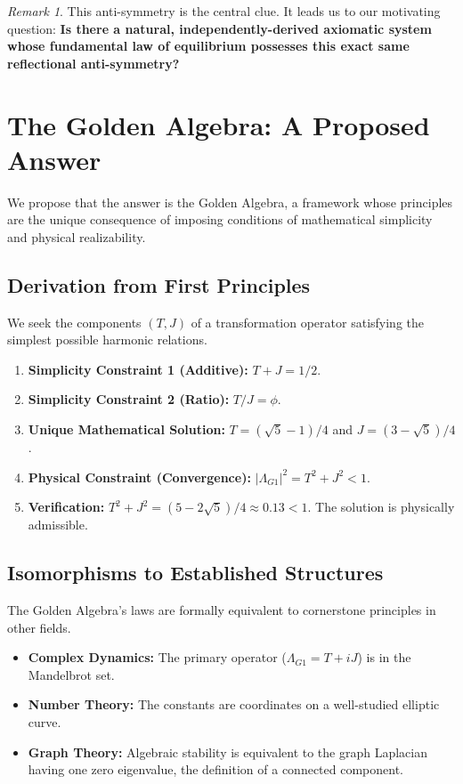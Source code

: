 \documentclass{article}
\theoremstyle{plain}
\theoremstyle{definition}
\theoremstyle{remark}
\newtheorem*{remark}{Remark}
\begin{document}
\begin{remark}
This anti-symmetry is the central clue. It leads us to our motivating question: \textbf{Is there a natural, independently-derived axiomatic system whose fundamental law of equilibrium possesses this exact same reflectional anti-symmetry?}
\end{remark}

\section{The Golden Algebra: A Proposed Answer}
\label{sec:algebra}
We propose that the answer is the Golden Algebra, a framework whose principles are the unique consequence of imposing conditions of mathematical simplicity and physical realizability.

\subsection{Derivation from First Principles}
We seek the components $(T, J)$ of a transformation operator satisfying the simplest possible harmonic relations.
\begin{enumerate}
    \item \textbf{Simplicity Constraint 1 (Additive):} $T+J=1/2$.
    \item \textbf{Simplicity Constraint 2 (Ratio):} $T/J=\phi$.
    \item \textbf{Unique Mathematical Solution:} $T = (\sqrt{5}-1)/4$ and $J = (3-\sqrt{5})/4$.
    \item \textbf{Physical Constraint (Convergence):} $|\Lambda_{G1}|^2 = T^2+J^2 < 1$.
    \item \textbf{Verification:} $T^2+J^2 = (5-2\sqrt{5})/4 \approx 0.13 < 1$. The solution is physically admissible.
\end{enumerate}

\subsection{Isomorphisms to Established Structures}
The Golden Algebra's laws are formally equivalent to cornerstone principles in other fields.
\begin{itemize}
    \item \textbf{Complex Dynamics:} The primary operator ($\Lambda_{G1} = T+iJ$) is in the Mandelbrot set.
    \item \textbf{Number Theory:} The constants are coordinates on a well-studied elliptic curve.
    \item \textbf{Graph Theory:} Algebraic stability is equivalent to the graph Laplacian having one zero eigenvalue, the definition of a connected component.
\end{itemize}
\end{document}
